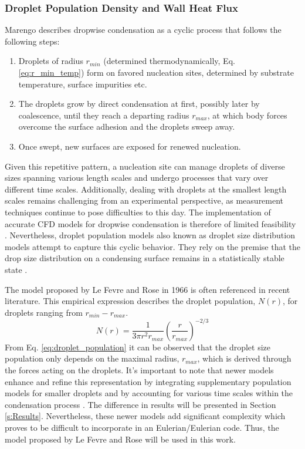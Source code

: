 \documentclass[12pt]{article}
\numberwithin{equation}{section}
\begin{document}
\subsubsection{Droplet Population Density and Wall Heat Flux}
Marengo \cite{marengo2022surface} describes dropwise condensation as a cyclic process that follows the following steps:
\begin{enumerate}
    \item Droplets of radius $r_{min}$ (determined thermodynamically, Eq. \ref{eq:r_min_temp}) form on favored nucleation sites, determined by substrate temperature, surface impurities etc.
    \item The droplets grow by direct condensation at first, possibly later by coalescence, until they reach a departing radius $r_{max}$, at which body forces overcome the surface adhesion and the droplets sweep away.
    \item Once swept, new surfaces are exposed for renewed nucleation.
\end{enumerate} 
Given this repetitive pattern, a nucleation site can manage droplets of diverse sizes spanning various length scales and undergo processes that vary over different time scales. Additionally, dealing with droplets at the smallest length scales remains challenging from an experimental perspective, as measurement techniques continue to pose difficulties to this day. The implementation of accurate CFD models for dropwise condensation is therefore of limited feasibility \cite{marengo2022surface}. Nevertheless, droplet population models also known as droplet size distribution models attempt to capture this cyclic behavior. They rely on the premise that the drop size distribution on a condensing surface remains in a statistically stable state \cite{marengo2022surface}.

The model proposed by Le Fevre and Rose in 1966 \cite{le1966theory} is often referenced in recent literature. This empirical expression describes the droplet population, $N(r)$, for droplets ranging from $r_{min}-r_{max}$.
\begin{equation}\label{eq:droplet_population}
    N(r)=\frac{1}{3\pi r^{2}r_{max}}\left(\frac{r}{r_{max}}\right)^{-2/3}
\end{equation}
From Eq. \ref{eq:droplet_population} it can be observed that the droplet size population only depends on the maximal radius, $r_{max}$, which is derived through the forces acting on the droplets. It's important to note that newer models enhance and refine this representation by integrating supplementary population models for smaller droplets and by accounting for various time scales within the condensation process \cite{marengo2022surface}. The difference in results will be presented in Section \ref{s:Results}. Nevertheless, these newer models add significant complexity which proves to be difficult to incorporate in an Eulerian/Eulerian code. Thus, the model proposed by Le Fevre and Rose will be used in this work.
\end{document}
